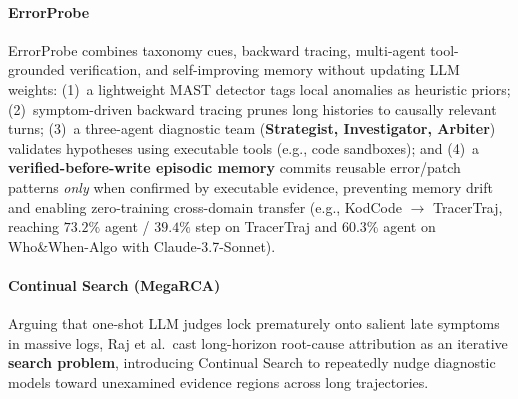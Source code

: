 \paragraph{ErrorProbe~\citep{li2026errorprobe}}
ErrorProbe combines taxonomy cues, backward tracing, multi-agent tool-grounded verification, and self-improving memory without updating LLM weights: (1)~a lightweight MAST detector tags local anomalies as heuristic priors; (2)~symptom-driven backward tracing prunes long histories to causally relevant turns; (3)~a three-agent diagnostic team (\textbf{Strategist, Investigator, Arbiter}) validates hypotheses using executable tools (e.g., code sandboxes); and (4)~a \textbf{verified-before-write episodic memory} commits reusable error/patch patterns \emph{only} when confirmed by executable evidence, preventing memory drift and enabling zero-training cross-domain transfer (e.g., KodCode $\to$ TracerTraj, reaching $73.2\%$ agent / $39.4\%$ step on TracerTraj and $60.3\%$ agent on Who\&When-Algo with Claude-3.7-Sonnet).

\paragraph{Continual Search (MegaRCA)~\citep{raj2026megarca}\,\webtag}
Arguing that one-shot LLM judges lock prematurely onto salient late symptoms in massive logs, Raj et al.\ cast long-horizon root-cause attribution as an iterative \textbf{search problem}, introducing Continual Search to repeatedly nudge diagnostic models toward unexamined evidence regions across long trajectories.
